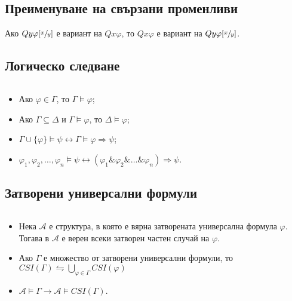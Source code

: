 \documentclass{article}
\begin{document}
\subsection*{Преименуване на свързани променливи}

\begin{prop}
Ако $Qy\varphi[\sfrac{x}{y}]$ е вариант на $Qx\varphi$, то $Qx\varphi$ е вариант на $Qy\varphi[\sfrac{x}{y}]$.
\end{prop}


\subsection*{Логическо следване}

\begin{prop}
$\ $

\begin{itemize}
\item Ако $\varphi \in \Gamma$, то $\Gamma \models \varphi$;
\item Ако $\Gamma \subseteq \Delta$ и $\Gamma \models \varphi$, то $\Delta \models \varphi$;
\item $\Gamma \cup \{\varphi\} \models \psi \longleftrightarrow \Gamma \models \varphi \Rightarrow \psi$;
\item $\varphi_1, \varphi_2, \ldots, \varphi_n \models \psi \longleftrightarrow (\varphi_1\&\varphi_2\&\ldots\&\varphi_n) \Rightarrow \psi$.
\end{itemize}
\end{prop}

\subsection*{Затворени универсални формули}

\begin{prop}
$\ $

\begin{itemize}
\item Нека $\mathcal{A}$ е структура, в която е вярна затворената универсална формула $\varphi$. Тогава в $\mathcal{A}$ е верен всеки затворен частен случай на $\varphi$.
\item Ако $\Gamma$ е множество от затворени универсални формули, то $CSI(\Gamma) \leftrightharpoons \underset{\varphi \in \Gamma}{\bigcup} CSI(\varphi)$
\item $\mathcal{A} \models \Gamma \longrightarrow \mathcal{A} \models CSI(\Gamma)$.
\end{itemize}
\end{prop}
\end{document}
